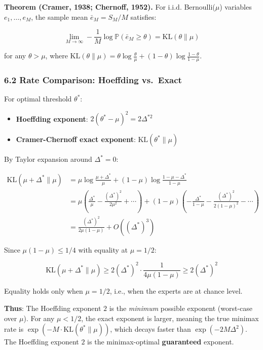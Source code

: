 \documentclass[
  12pt,
]{ctexart}
\providecommand{\tightlist}{%
  \setlength{\itemsep}{0pt}\setlength{\parskip}{0pt}}
\begin{document}
\textbf{Theorem (Cramer, 1938; Chernoff, 1952).} For i.i.d.
Bernoulli(\(\mu\)) variables \(e_1,\dots,e_M\), the sample mean
\(\bar{e}_M = S_M/M\) satisfies:

\[\lim_{M \to \infty} -\frac{1}{M} \log \mathbb{P}(\bar{e}_M \geq \theta) = \text{KL}(\theta \parallel \mu)\]

for any \(\theta > \mu\), where
\(\text{KL}(\theta \parallel \mu) = \theta\log\frac{\theta}{\mu} + (1-\theta)\log\frac{1-\theta}{1-\mu}\).

\subsubsection{6.2 Rate Comparison: Hoeffding
vs.~Exact}\label{rate-comparison-hoeffding-vs.-exact}

For optimal threshold \(\theta^*\):

\begin{itemize}
\tightlist
\item
  \textbf{Hoeffding exponent}: \(2(\theta^* - \mu)^2 = 2\Delta^{*2}\)
\item
  \textbf{Cramer-Chernoff exact exponent}:
  \(\text{KL}(\theta^* \parallel \mu)\)
\end{itemize}

By Taylor expansion around \(\Delta^* = 0\):

\[\begin{aligned}
\text{KL}(\mu + \Delta^* \parallel \mu) &= \mu\log\frac{\mu+\Delta^*}{\mu} + (1-\mu)\log\frac{1-\mu-\Delta^*}{1-\mu} \\
&= \mu\left(\frac{\Delta^*}{\mu} - \frac{(\Delta^*)^2}{2\mu^2} + \cdots\right) + (1-\mu)\left(-\frac{\Delta^*}{1-\mu} - \frac{(\Delta^*)^2}{2(1-\mu)^2} - \cdots\right) \\
&= \frac{(\Delta^*)^2}{2\mu(1-\mu)} + O((\Delta^*)^3)
\end{aligned}\]

Since \(\mu(1-\mu) \leq 1/4\) with equality at \(\mu = 1/2\):

\[\text{KL}(\mu+\Delta^* \parallel \mu) \geq 2(\Delta^*)^2 \cdot \frac{1}{4\mu(1-\mu)} \geq 2(\Delta^*)^2\]

Equality holds only when \(\mu = 1/2\), i.e., when the experts are at
chance level.

\textbf{Thus}: The Hoeffding exponent \(2\) is the \emph{minimum}
possible exponent (worst-case over \(\mu\)). For any \(\mu < 1/2\), the
exact exponent is larger, meaning the true minimax rate is
\(\exp(-M \cdot \text{KL}(\theta^* \parallel \mu))\), which decays
faster than \(\exp(-2M\Delta^2)\). The Hoeffding exponent \(2\) is the
minimax-optimal \textbf{guaranteed} exponent.
\end{document}
